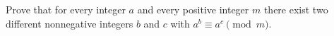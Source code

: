 Prove that for every integer $a$ and every positive integer $m$ there exist two different nonnegative integers $b$ and $c$ with $a^b\equiv a^c\pmod m$.

